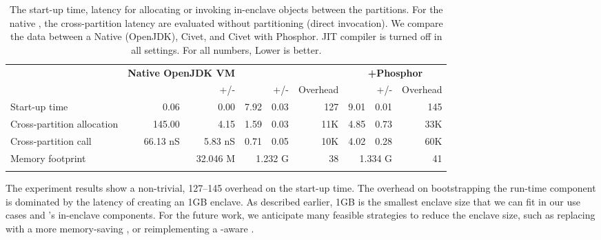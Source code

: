 \begin{table*}[t]
\caption{The start-up time, latency for allocating or invoking in-enclave objects between the partitions. For the native \jvm{}, the cross-partition latency are evaluated without partitioning (direct invocation). We compare the data between a Native \jvm{} (OpenJDK), Civet, and Civet with Phosphor. JIT compiler is turned off in all settings. For all numbers, Lower is better.}
\centering
\begin{tabular}{lrrrrrrrr}
\hline
\addlinespace[2pt]
 & \multicolumn{2}{c}{{\bf Native OpenJDK VM}} & \multicolumn{3}{c}{{\bf \sysname{}}} & \multicolumn{3}{c}{{\bf \sysname{}+Phosphor}} \\
 & & {\footnotesize +/-} & &  {\footnotesize +/-} & Overhead &  & {\footnotesize +/-} & Overhead \\
\hline
\addlinespace[2pt]
Start-up time &  0.06 \hspace{0.5em}\asec{}  & 0.00 \hspace{0.5em}\asec{} & 7.92 \hspace{0.5em}\asec{} & 0.03 \hspace{0.5em}\asec{} & 127 \x{} & 9.01 \hspace{0.5em}\asec{} & 0.01 \hspace{0.5em}\asec{} & 145 \x{} \\
Cross-partition allocation &  145.00 \nsec{}  & 4.15 \nsec{} & 1.59 \usec{} & 0.03 \usec{} & 11K \x{} & 4.85 \usec{} & 0.73 \usec{} & 33K \x{} \\
Cross-partition call       & 66.13 nS & 5.83 nS & 0.71 \usec{} & 0.05 \usec{} & 10K \x{} & 4.02 \usec{} & 0.28 \usec{} & 60K \x{} \\
\addlinespace[2pt]
\hline
\addlinespace[2pt]
Memory footprint & \multicolumn{2}{r}{32.046 M}&  \multicolumn{2}{r}{1.232 G} & 38 \x{} & \multicolumn{2}{r}{1.334 G} & 41 \x{} \\
\addlinespace[2pt]
\hline
\end{tabular}
\label{tab:perf}
\end{table*}

The experiment results show a non-trivial, 127--145 \x{} overhead on
the start-up time. %
The overhead on bootstrapping the \sysname{} run-time component
is dominated by the latency of creating an 1GB \sgx{} enclave.
As described earlier, 1GB is the smallest enclave size
that we can fit in our use cases and \sysname{}'s in-enclave components.
For the future work, we anticipate many feasible strategies to reduce the enclave size, such as replacing with a more memory-saving \jvm{}, or reimplementing a \sgx{}-aware \jvmname{}.


